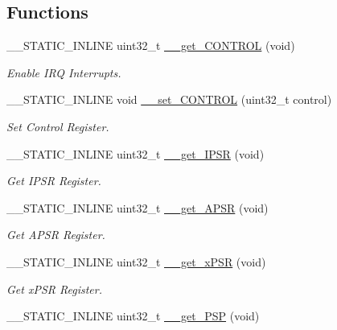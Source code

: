 \subsection*{Functions}
\begin{DoxyCompactItemize}
\item 
\+\_\+\+\_\+\+S\+T\+A\+T\+I\+C\+\_\+\+I\+N\+L\+I\+NE uint32\+\_\+t \hyperlink{group___c_m_s_i_s___core___reg_acc_functions_ga7dd5c942bee32f055b90153feb950f59}{\+\_\+\+\_\+get\+\_\+\+C\+O\+N\+T\+R\+OL} (void)
\begin{DoxyCompactList}\small\item\em Enable I\+RQ Interrupts. \end{DoxyCompactList}\item 
\+\_\+\+\_\+\+S\+T\+A\+T\+I\+C\+\_\+\+I\+N\+L\+I\+NE void \hyperlink{group___c_m_s_i_s___core___reg_acc_functions_ga0102d0939d9b26c5c792be6bf5fd550f}{\+\_\+\+\_\+set\+\_\+\+C\+O\+N\+T\+R\+OL} (uint32\+\_\+t control)
\begin{DoxyCompactList}\small\item\em Set Control Register. \end{DoxyCompactList}\item 
\+\_\+\+\_\+\+S\+T\+A\+T\+I\+C\+\_\+\+I\+N\+L\+I\+NE uint32\+\_\+t \hyperlink{group___c_m_s_i_s___core___reg_acc_functions_gaf15a71855b9d731d11de92704c82bd18}{\+\_\+\+\_\+get\+\_\+\+I\+P\+SR} (void)
\begin{DoxyCompactList}\small\item\em Get I\+P\+SR Register. \end{DoxyCompactList}\item 
\+\_\+\+\_\+\+S\+T\+A\+T\+I\+C\+\_\+\+I\+N\+L\+I\+NE uint32\+\_\+t \hyperlink{group___c_m_s_i_s___core___reg_acc_functions_gadff4f1e599946e8ae96fba17b5245f04}{\+\_\+\+\_\+get\+\_\+\+A\+P\+SR} (void)
\begin{DoxyCompactList}\small\item\em Get A\+P\+SR Register. \end{DoxyCompactList}\item 
\+\_\+\+\_\+\+S\+T\+A\+T\+I\+C\+\_\+\+I\+N\+L\+I\+NE uint32\+\_\+t \hyperlink{group___c_m_s_i_s___core___reg_acc_functions_ga52ca795dc9429ee0ac64ddd12c034834}{\+\_\+\+\_\+get\+\_\+x\+P\+SR} (void)
\begin{DoxyCompactList}\small\item\em Get x\+P\+SR Register. \end{DoxyCompactList}\item 
\+\_\+\+\_\+\+S\+T\+A\+T\+I\+C\+\_\+\+I\+N\+L\+I\+NE uint32\+\_\+t \hyperlink{group___c_m_s_i_s___core___reg_acc_functions_ga826c53e30812e350c77f58aac9f42bcb}{\+\_\+\+\_\+get\+\_\+\+P\+SP} (void)

\end{DoxyCompactItemize}
